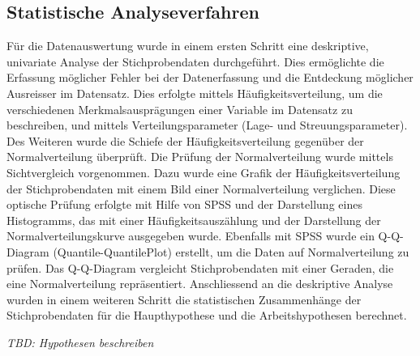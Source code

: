 \subsection{Statistische Analyseverfahren}
Für die Datenauswertung wurde in einem ersten Schritt eine deskriptive, univariate Analyse der Stichprobendaten durchgeführt. Dies ermöglichte die Erfassung möglicher Fehler bei der Datenerfassung und die Entdeckung möglicher Ausreisser im Datensatz. Dies erfolgte mittels Häufigkeitsverteilung, um die verschiedenen Merkmalsausprägungen einer Variable im Datensatz zu beschreiben, und mittels Verteilungsparameter (Lage- und Streuungsparameter). Des Weiteren wurde die Schiefe der Häufigkeitsverteilung gegenüber der Normalverteilung überprüft. Die Prüfung der Normalverteilung wurde mittels Sichtvergleich vorgenommen. Dazu wurde eine Grafik der Häufigkeitsverteilung der Stichprobendaten mit einem Bild einer Normalverteilung verglichen. Diese optische Prüfung erfolgte mit Hilfe von SPSS und der Darstellung eines Histogramms, das mit einer Häufigkeitsauszählung und der Darstellung der Normalverteilungskurve ausgegeben wurde. Ebenfalls mit SPSS wurde ein Q-Q-Diagram (Quantile-QuantilePlot) erstellt, um die Daten auf Normalverteilung zu prüfen. Das Q-Q-Diagram vergleicht Stichprobendaten mit einer Geraden, die eine Normalverteilung repräsentiert. Anschliessend an die deskriptive Analyse wurden in einem weiteren Schritt die statistischen Zusammenhänge der Stichprobendaten für die Haupthypothese und die Arbeitshypothesen berechnet.

\textit{TBD: Hypothesen beschreiben}
